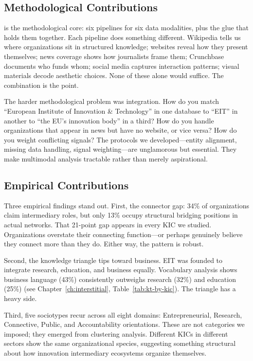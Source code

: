 \documentclass[../main.tex]{subfiles}
\begin{document}
\subsection{Methodological Contributions}

\RoleBox{} is the methodological core: six pipelines for six data modalities, plus the glue that holds them together. Each pipeline does something different. Wikipedia tells us where organizations sit in structured knowledge; websites reveal how they present themselves; news coverage shows how journalists frame them; Crunchbase documents who funds whom; social media captures interaction patterns; visual materials decode aesthetic choices. None of these alone would suffice. The combination is the point.

The harder methodological problem was integration. How do you match ``European Institute of Innovation \& Technology'' in one database to ``EIT'' in another to ``the EU's innovation body'' in a third? How do you handle organizations that appear in news but have no website, or vice versa? How do you weight conflicting signals? The protocols we developed---entity alignment, missing data handling, signal weighting---are unglamorous but essential. They make multimodal analysis tractable rather than merely aspirational.

\subsection{Empirical Contributions}

Three empirical findings stand out. First, the connector gap: 34\% of organizations claim intermediary roles, but only 13\% occupy structural bridging positions in actual networks. That 21-point gap appears in every KIC we studied. Organizations overstate their connecting function---or perhaps genuinely believe they connect more than they do. Either way, the pattern is robust.

Second, the knowledge triangle tips toward business. EIT was founded to integrate research, education, and business equally. Vocabulary analysis shows business language (43\%) consistently outweighs research (32\%) and education (25\%) (see Chapter~\ref{ch:interstitial}, Table~\ref{tab:kt-by-kic}). The triangle has a heavy side.

Third, five sociotypes recur across all eight domains: Entrepreneurial, Research, Connective, Public, and Accountability orientations. These are not categories we imposed; they emerged from clustering analysis. Different KICs in different sectors show the same organizational species, suggesting something structural about how innovation intermediary ecosystems organize themselves.
\end{document}
